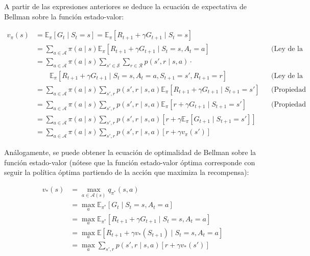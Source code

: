 \documentclass[11pt,a4paper]{article}
\begin{document}
		A partir de las expresiones anteriores se deduce la ecuación de expectativa de Bellman sobre la función estado-valor:
		
		\begin{align}
		v_\pi(s) &= \mathbb{E}_\pi[G_t \mid S_t = s] = \mathbb{E}_\pi[R_{t+1} + \gamma G_{t+1} \mid S_t = s] \nonumber \\
		&=\sum_{a \in \mathcal{A}} \pi(a \mid s) \mathbb{E}_\pi[R_{t+1} + \gamma G_{t+1} \mid S_t = s, A_t = a] && \text{(Ley de la probabilidad total)} \nonumber \\
		&=\sum_{a \in \mathcal{A}} \pi(a \mid s) \sum_{s' \in \mathcal{S}} \sum_{r \in \mathcal{R}} p(s', r \mid s, a) \cdot \nonumber \\
		&\qquad\mathbb{E}_\pi[R_{t+1} + \gamma G_{t+1} \mid S_t = s, A_t = a, S_{t+1} = s', R_{t+1} = r] && \text{(Ley de la probabilidad total)} \nonumber \\
		&=\sum_{a \in \mathcal{A}} \pi(a \mid s) \sum_{s',r} p(s', r \mid s, a) \mathbb{E}_\pi[R_{t+1} + \gamma G_{t+1} \mid S_{t+1} = s'] && \text{(Propiedad Markoviana)} \nonumber \\
		&=\sum_{a \in \mathcal{A}} \pi(a \mid s) \sum_{s',r} p(s', r \mid s, a) \mathbb{E}_\pi[r+ \gamma G_{t+1} \mid S_{t+1} = s'] && \text{(Propiedad Markoviana)} \nonumber\\
		&=\sum_{a \in \mathcal{A}} \pi(a \mid s) \sum_{s',r} p(s', r \mid s, a) \left[ r + \gamma \mathbb{E}_\pi[G_{t+1} \mid S_{t+1} = s'] \right] \nonumber \\
		&=\sum_{a \in \mathcal{A}} \pi(a \mid s) \sum_{s',r} p(s', r \mid s, a) \left[ r + \gamma v_{\pi}(s') \right]
		\end{align}
		
		Análogamente, se puede obtener la ecuación de optimalidad de Bellman sobre la función estado-valor (nótese que la función estado-valor óptima corresponde con seguir la política óptima partiendo de la acción que maximiza la recompensa):
		
		\begin{align}
		v_{*}(s) &= \max_{a \in \mathcal{A}(s)} q_{\pi^*}(s, a) \nonumber \\
		&= \max_a \mathbb{E}_{\pi^*} [G_t \mid S_t = s, A_t = a] \nonumber \\
		&= \max_a \mathbb{E}_{\pi^*} [R_{t+1} + \gamma G_{t+1} \mid S_t = s, A_t = a] \nonumber \\
		&= \max_a \mathbb{E} [R_{t+1} + \gamma v_{*}(S_{t+1}) \mid S_t = s, A_t = a] \nonumber \\
		&= \max_{a} \sum_{s', r} p(s', r \mid s, a) \left[ r + \gamma v_{*}(s') \right]
		\end{align}
		
\end{document}

